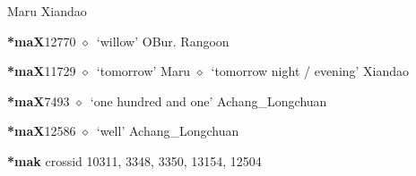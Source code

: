 \begin{list}{}{\leftmargin=1.5em \itemindent=-1.5em}
         Maru 
\hspace{1ex}
         Xiandao 
  \item {\footnotesize \textbf{*maX}}{\tiny 12770}
\hspace{1ex}
         $\diamond$~`willow'
         OBur. 
\hspace{1ex}
         Rangoon 
  \item {\footnotesize \textbf{*maX}}{\tiny 11729}
\hspace{1ex}
         $\diamond$~`tomorrow'
         Maru 
\hspace{1ex}
         $\diamond$~`tomorrow night / evening'
         Xiandao 
  \item {\footnotesize \textbf{*maX}}{\tiny 7493}
\hspace{1ex}
         $\diamond$~`one hundred and one'
         Achang\_Longchuan 
  \item {\footnotesize \textbf{*maX}}{\tiny 12586}
\hspace{1ex}
         $\diamond$~`well'
         Achang\_Longchuan 
  \end{list}
\item
\textbf{*mak}
  {\tiny crossid 10311, 3348, 3350, 13154, 12504}
